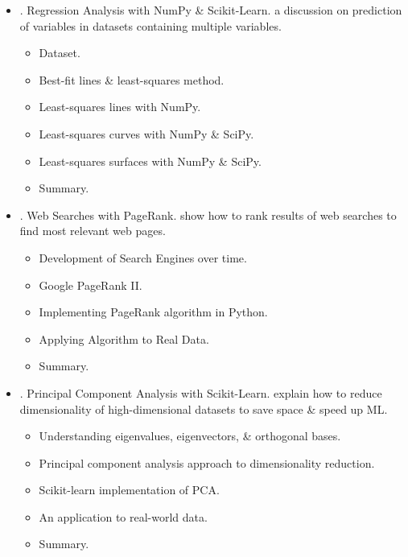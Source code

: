 \documentclass{article}
\begin{document}
\begin{enumerate}
	\begin{itemize}
		\item {. Regression Analysis with NumPy \& Scikit-Learn.} a discussion on prediction of variables in datasets containing multiple variables.
		\begin{itemize}
			\item {\sf Dataset.}
			\item {\sf Best-fit lines \& least-squares method.}
			\item {\sf Least-squares lines with NumPy.}
			\item {\sf Least-squares curves with NumPy \& SciPy.}
			\item {\sf Least-squares surfaces with NumPy \& SciPy.}
			\item {\sf Summary.}
		\end{itemize}
		\item {. Web Searches with PageRank.} show how to rank results of web searches to find most relevant web pages.
		\begin{itemize}
			\item {\sf Development of Search Engines over time.}
			\item {\sf Google PageRank II.}
			\item {\sf Implementing PageRank algorithm in Python.}
			\item {\sf Applying Algorithm to Real Data.}
			\item {\sf Summary.}
		\end{itemize}
		\item {. Principal Component Analysis with Scikit-Learn.} explain how to reduce dimensionality of high-dimensional datasets to save space \& speed up ML.
		\begin{itemize}
			\item {\sf Understanding eigenvalues, eigenvectors, \& orthogonal bases.}
			\item {\sf Principal component analysis approach to dimensionality reduction.}
			\item {\sf Scikit-learn implementation of PCA.}
			\item {\sf An application to real-world data.}
			\item {\sf Summary.}
		\end{itemize}
	\end{itemize}
\end{enumerate}

\end{document}
